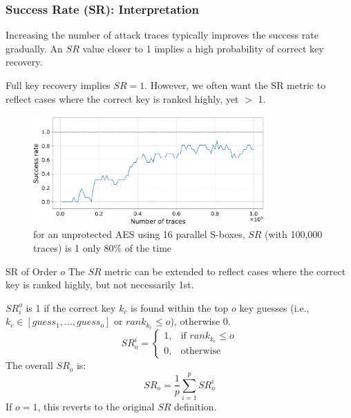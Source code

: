 \begin{frame}
    \frametitle{Success Rate (SR): Interpretation}
    Increasing the number of attack traces typically improves the success rate gradually.
    An $SR$ value closer to 1 implies a high probability of correct key recovery. \newline %

    Full key recovery implies $SR=1$. However, we often want the SR metric to reflect cases where the correct key is ranked highly, yet $>$ 1. 
    \newline

    \begin{figure}[htbp]
        \centering
        \includegraphics[width=0.8\textwidth]{metrics/Pictures/SR_plot_unprotected.png}
        \caption{for an unprotected AES using 16 parallel S-boxes, $SR$ (with 100,000 traces) is 1 only 80\% of the time}
    \end{figure}
\end{frame}
\begin{frame}
    \begin{block}{SR of Order $o$}
        The $SR$ metric can be extended to reflect cases where the correct key is ranked highly, but not necessarily 1st.
        
        $SR_i^o$ is 1 if the correct key $k_c$ is found within the top $o$ key guesses (i.e., $k_c \in [guess_1, \dots, guess_o]$ or $rank_{k_c} \le o$), otherwise 0.
        $$ SR_o^i = \begin{cases} 1, & \text{if } rank_{k_c} \le o \\ 0, & \text{otherwise} \end{cases} $$
        The overall $SR_o$ is:
        $$ SR_o = \frac{1}{p} \sum_{i=1}^{p} SR_o^i $$
        If $o=1$, this reverts to the original $SR$ definition.
    \end{block}
\end{frame}


